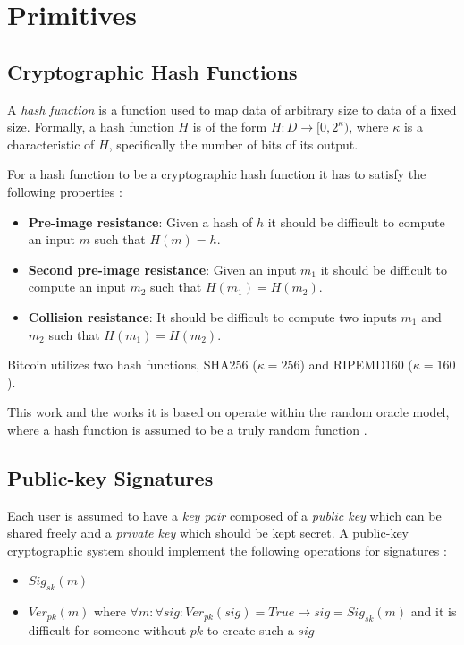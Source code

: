 \section{Primitives}
\subsection{Cryptographic Hash Functions}
A \textit{hash function} is a function used to map data of arbitrary size to data of a fixed size. Formally, a hash function $H$ is of the form $H: D \rightarrow [0, 2^\kappa)$, where $\kappa$ is a characteristic of $H$, specifically the number of bits of its output.

For a hash function to be a cryptographic hash function it has to satisfy the following properties \cite{katz}:
\begin{itemize}
  \item \textbf{Pre-image resistance}: Given a hash of $h$ it should be difficult to compute an input $m$ such that $H(m) = h$.
  \item \textbf{Second pre-image resistance}: Given an input $m_1$ it should be difficult to compute an input $m_2$ such that $H(m_1) = H(m_2)$.
  \item \textbf{Collision resistance}: It should be difficult to compute two inputs $m_1$ and $m_2$ such that $H(m_1) = H(m_2)$.
\end{itemize}

Bitcoin utilizes two hash functions, SHA256 ($\kappa=256$) and RIPEMD160 ($\kappa=160$).

This work and the works it is based on \cite{nipopows} operate within the random oracle model, where a hash function is assumed to be a truly random function \cite{katz}.

\subsection{Public-key Signatures}
Each user is assumed to have a \textit{key pair} composed of a \textit{public key} which can be shared freely and a \textit{private key} which should be kept secret. A public-key cryptographic system should implement the following operations for signatures \cite{katz}:

\begin{itemize}
  \item $Sig_{sk}(m)$
  \item $Ver_{pk}(m)$ where $\forall m: \forall sig: Ver_{pk}(sig) = True \rightarrow sig = Sig_{sk}(m)$ and it is difficult for someone without $pk$ to create such a $sig$
\end{itemize}

